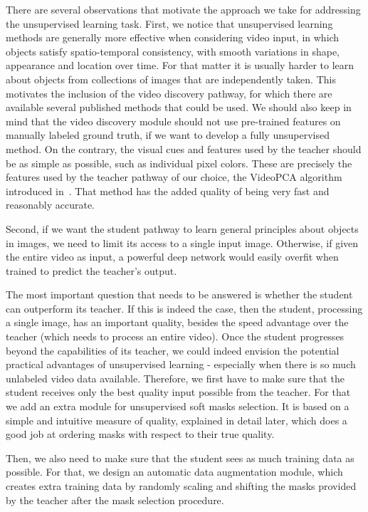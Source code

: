 \documentclass[10pt,twocolumn,letterpaper]{article}
\begin{document}
There are several observations that motivate the approach we take for addressing the unsupervised learning task. First, we notice that unsupervised learning methods are generally more effective when considering video input, in which objects satisfy spatio-temporal consistency, with smooth variations in shape, appearance and location over time. For that matter it is usually harder to learn about objects from collections of images that are independently taken. 
This motivates the inclusion of the video discovery pathway, for which there are available several published methods that could be used. We should also keep in mind that the video discovery module should not use pre-trained features on manually labeled ground truth, if we want to develop a fully unsupervised method. On the contrary, the visual cues and features used by the teacher should be as simple as possible, such as individual pixel colors. These are precisely the features used by the teacher pathway of our choice, the VideoPCA algorithm introduced in~\cite{stretcu2015multiple}. That method has the added quality of being very fast and reasonably accurate.

Second, if we want the student pathway to learn general principles about objects in images, we need to limit its access to a single input image. Otherwise, if given the entire video as input, a powerful deep network would easily overfit when trained to predict the teacher's output.

The most important question that needs to be answered is whether the student can outperform its teacher. If this is indeed the case, then the student, processing a single image, has an important quality, besides the speed advantage over the teacher (which needs to process an entire video). Once the student progresses beyond the capabilities of its teacher, we could indeed envision the potential practical advantages of unsupervised learning - especially when there is so much unlabeled video data available. Therefore, we first have to make sure that the student receives only the best quality input possible from the teacher. For that we add an extra module for unsupervised soft masks selection. It is based on a simple and intuitive measure of quality, explained in detail later, which does a good job at ordering masks with respect to their true quality. 

Then, we also need to make sure that the student sees as much training data as possible. For that, we design an automatic data augmentation module, which creates extra training data by randomly scaling and shifting the masks provided by the teacher after the mask selection procedure.
\end{document}
